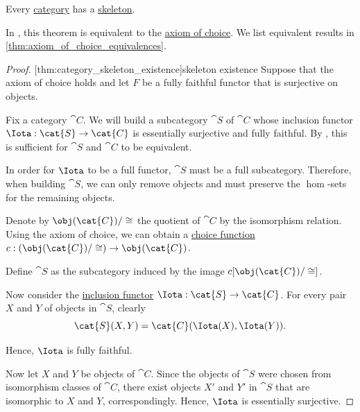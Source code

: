 \begin{theorem}\label{thm:category_skeleton_existence}
  Every \hyperref[def:category]{category} has a \hyperref[def:skeletal_category]{skeleton}.
\end{theorem}
\begin{comments}
  \item In \hyperref[def:zfc]{}, this theorem is equivalent to the \hyperref[def:zfc/choice]{axiom of choice}. We list equivalent results in \cref{thm:axiom_of_choice_equivalences}.
\end{comments}
\begin{proof}
  [thm:category_skeleton_existence]{skeleton existence} Suppose that the axiom of choice holds and let \( F \) be a fully faithful functor that is surjective on objects.

  Fix a category \( \cat{C} \). We will build a subcategory \( \cat{S} \) of \( \cat{C} \) whose inclusion functor \( \Iota: \cat{S} \to \cat{C} \) is essentially surjective and fully faithful. By , this is sufficient for \( \cat{S} \) and \( \cat{C} \) to be equivalent.

  In order for \( \Iota \) to be a full functor, \( \cat{S} \) must be a full subcategory. Therefore, when building \( \cat{S} \), we can only remove objects and must preserve the \( \hom \)-sets for the remaining objects.

  Denote by \( \obj(\cat{C}) / \cong \) the quotient of \( \cat{C} \) by the isomorphism relation. Using the axiom of choice, we can obtain a \hyperref[def:choice_function]{choice function} \( c: (\obj(\cat{C}) / \cong) \to \obj(\cat{C}) \).

  Define \( \cat{S} \) as the subcategory induced by the image \( c[\obj(\cat{C}) / \cong] \).

  Now consider the \hyperref[def:subcategory]{inclusion functor} \( \Iota: \cat{S} \to \cat{C} \). For every pair \( X \) and \( Y \) of objects in \( \cat{S} \), clearly
  \begin{equation*}
    \cat{S}(X, Y) = \cat{C}(\Iota(X), \Iota(Y)).
  \end{equation*}

  Hence, \( \Iota \) is fully faithful.

  Now let \( X \) and \( Y \) be objects of \( \cat{C} \). Since the objects of \( \cat{S} \) were chosen from isomorphism classes of \( \cat{C} \), there exist objects \( X' \) and \( Y' \) in \( \cat{S} \) that are isomorphic to \( X \) and \( Y \), correspondingly. Hence, \( \Iota \) is essentially surjective.


\end{proof}
